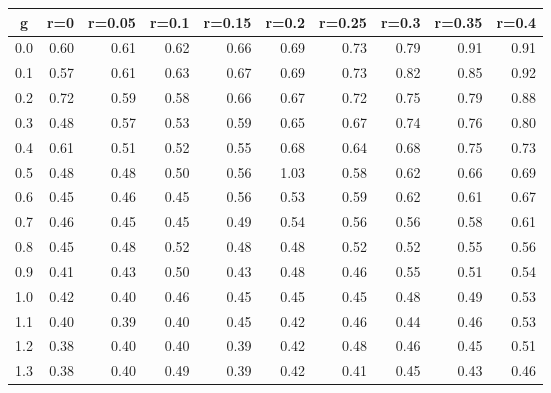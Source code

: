 %
\begin{table}[!tbp]
 \begin{center}
 \begin{tabular}{rrrrrrrrrr}\hline\hline
\multicolumn{1}{c}{g}&\multicolumn{1}{c}{r=0}&\multicolumn{1}{c}{r=0.05}&\multicolumn{1}{c}{r=0.1}&\multicolumn{1}{c}{r=0.15}&\multicolumn{1}{c}{r=0.2}&\multicolumn{1}{c}{r=0.25}&\multicolumn{1}{c}{r=0.3}&\multicolumn{1}{c}{r=0.35}&\multicolumn{1}{c}{r=0.4}\tabularnewline
\hline
0.0&0.60&0.61&0.62&0.66&0.69&0.73&0.79&0.91&0.91\tabularnewline
0.1&0.57&0.61&0.63&0.67&0.69&0.73&0.82&0.85&0.92\tabularnewline
0.2&0.72&0.59&0.58&0.66&0.67&0.72&0.75&0.79&0.88\tabularnewline
0.3&0.48&0.57&0.53&0.59&0.65&0.67&0.74&0.76&0.80\tabularnewline
0.4&0.61&0.51&0.52&0.55&0.68&0.64&0.68&0.75&0.73\tabularnewline
0.5&0.48&0.48&0.50&0.56&1.03&0.58&0.62&0.66&0.69\tabularnewline
0.6&0.45&0.46&0.45&0.56&0.53&0.59&0.62&0.61&0.67\tabularnewline
0.7&0.46&0.45&0.45&0.49&0.54&0.56&0.56&0.58&0.61\tabularnewline
0.8&0.45&0.48&0.52&0.48&0.48&0.52&0.52&0.55&0.56\tabularnewline
0.9&0.41&0.43&0.50&0.43&0.48&0.46&0.55&0.51&0.54\tabularnewline
1.0&0.42&0.40&0.46&0.45&0.45&0.45&0.48&0.49&0.53\tabularnewline
1.1&0.40&0.39&0.40&0.45&0.42&0.46&0.44&0.46&0.53\tabularnewline
1.2&0.38&0.40&0.40&0.39&0.42&0.48&0.46&0.45&0.51\tabularnewline
1.3&0.38&0.40&0.49&0.39&0.42&0.41&0.45&0.43&0.46\tabularnewline
\hline
\end{tabular}

\end{center}

\end{table}

